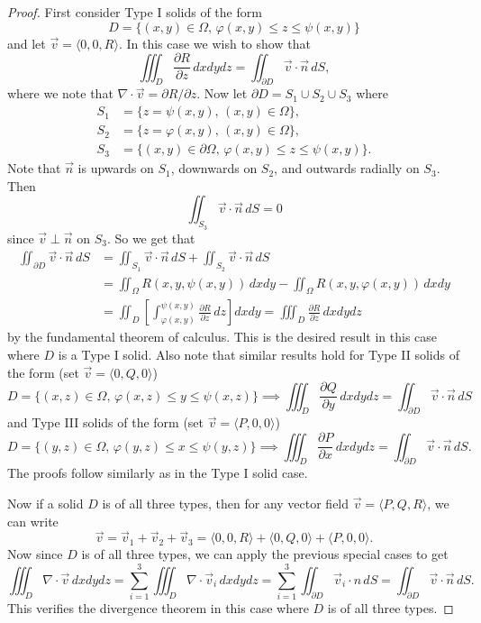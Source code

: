 \begin{proof}
  First consider Type I solids of the form
  \[
    D = \{(x, y) \in \Omega,\, \varphi(x, y) \le z \le \psi(x, y)\}
  \]
  and let $\vec{v} = \langle 0, 0, R \rangle$. In this
  case we wish to show that
  \[
    \iiint_D \frac{\partial R}{\partial z} \, dxdydz
    = \iint_{\partial D} \vec{v} \cdot \vec{n}\, dS,
  \]
  where we note that $\nabla \cdot \vec{v} = \partial R / \partial z$.
  Now let $\partial D = S_1 \cup S_2 \cup S_3$ where
  \begin{align*}
    S_1 &= \{z = \psi(x, y),\, (x, y) \in \Omega\}, \\
    S_2 &= \{z = \varphi(x, y),\, (x, y) \in \Omega\}, \\
    S_3 &= \{(x, y) \in \partial \Omega,\, \varphi(x, y) \le z \le \psi(x, y)\}.
  \end{align*}
  Note that $\vec{n}$ is upwards on $S_1$, downwards
  on $S_2$, and outwards radially on $S_3$. Then
  \[
    \iint_{S_3} \vec{v} \cdot \vec{n}\, dS
    = 0
  \]
  since $\vec{v} \perp \vec{n}$ on $S_3$. So we get that
  \begin{align*}
    \iint_{\partial D} \vec{v} \cdot \vec{n}\, dS
    &= \iint_{S_1} \vec{v} \cdot \vec{n}\, dS
    + \iint_{S_2} \vec{v} \cdot \vec{n}\, dS \\
    &= \iint_\Omega R(x, y, \psi(x, y))\, dxdy
    - \iint_\Omega R(x, y, \varphi(x, y))\, dxdy \\
    &= \iint_D \left[\int_{\varphi(x, y)}^{\psi(x, y)} \frac{\partial R}{\partial z}\, dz \right] dxdy
    = \iiint_D \frac{\partial R}{\partial z}\, dxdydz
  \end{align*}
  by the fundamental theorem of calculus. This is
  the desired result in this case where $D$ is a Type
  I solid. Also note that similar
  results hold for Type II solids of the form
  (set $\vec{v} = \langle 0, Q, 0 \rangle$)
  \[
    D = \{(x, z) \in \Omega,\, \varphi(x, z) \le y \le \psi(x, z)\}
    \implies \iiint_D \frac{\partial Q}{\partial y}\, dxdydz
    = \iint_{\partial D} \vec{v} \cdot \vec{n}\, dS
  \]
  and Type III solids of the form (set $\vec{v} = \langle P, 0, 0 \rangle$)
  \[
  D = \{(y, z) \in \Omega,\, \varphi(y, z) \le x \le \psi(y, z)\}
  \implies \iiint_D \frac{\partial P}{\partial x}\, dxdydz
  = \iint_{\partial D} \vec{v} \cdot \vec{n}\, dS
  .\]
  The proofs follow similarly as in the Type I
  solid case.

  Now if a solid $D$ is of all three types, then
  for any vector field $\vec{v} = \langle P, Q, R \rangle$,
  we can write
  \[
    \vec{v} = \vec{v}_1 + \vec{v}_2 + \vec{v}_3
    = \langle 0, 0, R \rangle + \langle 0, Q, 0 \rangle + \langle P, 0, 0 \rangle .
  \]
  Now since $D$ is of all three types, we can apply the
  previous special cases to get
  \[
    \iiint_D \nabla \cdot \vec{v}\, dxdydz
    = \sum_{i=1}^3 \iiint_{D} \nabla \cdot \vec{v}_i\, dxdydz
    = \sum_{i=1}^3 \iint_{\partial D} \vec{v}_i \cdot {n} \, dS
    = \iint_{\partial D} \vec{v} \cdot \vec{n}\, dS.
  \]
  This verifies the divergence theorem in this case where
  $D$ is of all three types.


\end{proof}
